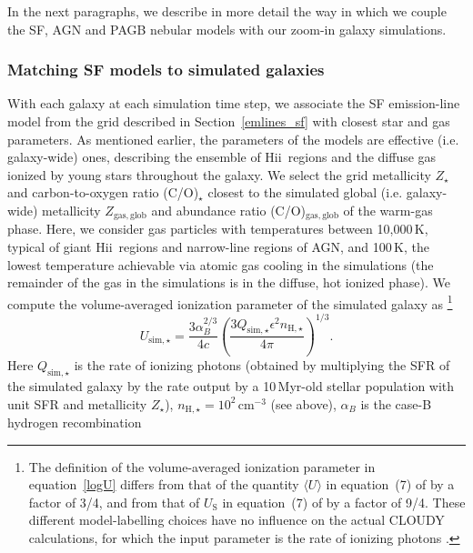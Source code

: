 \documentclass[fleqn,usenatbib]{mnras}
\newcommand{\hii}{\hbox{H{\sc ii}}}
\begin{document}
In the next paragraphs, we describe in more detail the way in which 
we couple the SF, AGN and PAGB nebular models with our zoom-in galaxy
simulations.    

\subsubsection{Matching SF models to simulated galaxies}\label{sfmatch}

With each galaxy at each simulation time step, we associate the SF
emission-line  model from the \citet{Gutkin16} grid described in
Section~\ref{emlines_sf} with closest star and gas parameters. 
 As mentioned earlier, the parameters of the \citet{Gutkin16} models
are effective (i.e. galaxy-wide) ones, describing the ensemble of \hii\ 
regions and the diffuse gas ionized by young stars throughout the galaxy. 
We select the grid metallicity $Z_{\star}$ and carbon-to-oxygen ratio
(C/O)$_{\star}$ closest to the simulated global (i.e. galaxy-wide)
metallicity $Z_{\mathrm{gas, glob}}$ and abundance ratio 
(C/O)$_{\mathrm{gas, glob}}$  of the warm-gas phase. Here, we consider gas
particles with temperatures  between 10,000\,K, typical of giant \hii\ 
regions and narrow-line regions of AGN, and 100\,K, the
lowest  temperature achievable via atomic gas cooling in the simulations (the
remainder of the gas in the simulations is in the diffuse, hot ionized
phase). We compute the volume-averaged ionization parameter of the
simulated galaxy as \citep[see, e.g., equation~B.6
of][]{Panuzzo03}\footnote{ The definition of the volume-averaged
  ionization parameter in equation~\eqref{logU} 
differs from that of the quantity $\langle U\rangle$ in equation~(7)
of \citet{Charlot01} 
by a factor of 3/4, and from that of $U_{\mathrm S}$ in equation~(7) of 
\citet{Gutkin16} by a factor of 9/4. These different model-labelling choices
have no influence on the actual CLOUDY calculations, for
which the input parameter is the rate of ionizing photons
\citep[equation~8 of][]{Charlot01}.}
\begin{equation}\label{logU}
U_{\mathrm{sim}, \star} = \frac{3\alpha_B^{2/3}}{4c} \left(
    \frac{3Q_{\mathrm{sim},\star}\epsilon^2n_{\mathrm{H},\star}}{4 \pi} \right)^{1/3}.
\end{equation}
Here $Q_{\mathrm{sim},\star}$ is the rate of ionizing photons
(obtained by multiplying the  SFR of the simulated galaxy by the rate
output by a 10\,Myr-old stellar population with unit SFR and
metallicity $Z_{\star}$), $n_{\mathrm{H}, \star} =10^2\,$cm$^{-3}$
(see above), $\alpha_B$ is the case-B hydrogen recombination
\end{document}
